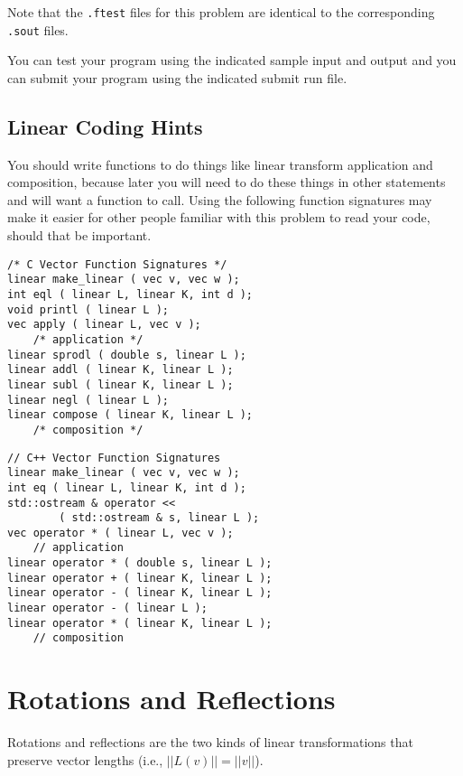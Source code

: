 \documentclass[12pt]{article}
\begin{document}
Note that the {\tt .ftest} files for this problem are identical
to the corresponding {\tt .sout} files.

You can test your program using the indicated sample input and
output and you can submit your program using the indicated submit
run file.

\newpage

\subsection{Linear Coding Hints}

You should write functions to do things like linear transform
application and composition,
because later you will need to do these things in other
statements and will want a function to call.  Using the following
function signatures may make it easier
for other people familiar with this problem to read your
code, should that be important.

\hspace*{0.3in}\begin{minipage}{5.0in}
\begin{verbatim}
/* C Vector Function Signatures */
linear make_linear ( vec v, vec w );
int eql ( linear L, linear K, int d );
void printl ( linear L );
vec apply ( linear L, vec v );
    /* application */
linear sprodl ( double s, linear L );
linear addl ( linear K, linear L );
linear subl ( linear K, linear L );
linear negl ( linear L );
linear compose ( linear K, linear L );
    /* composition */
\end{verbatim}
\end{minipage}

\bigskip

\hspace*{0.3in}\begin{minipage}{5.0in}
\begin{verbatim}
// C++ Vector Function Signatures
linear make_linear ( vec v, vec w );
int eq ( linear L, linear K, int d );
std::ostream & operator <<
        ( std::ostream & s, linear L );
vec operator * ( linear L, vec v );
    // application
linear operator * ( double s, linear L );
linear operator + ( linear K, linear L );
linear operator - ( linear K, linear L );
linear operator - ( linear L );
linear operator * ( linear K, linear L );
    // composition
\end{verbatim}
\end{minipage}

\section{Rotations and Reflections}
Rotations and reflections are the two kinds of linear transformations
that preserve vector lengths (i.e., $||L(v)||=||v||$).
\end{document}

